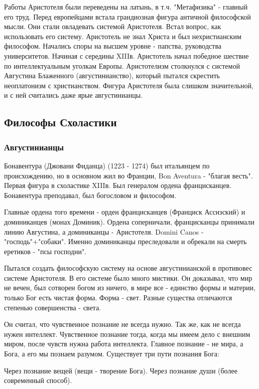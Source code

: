 Работы Аристотеля были переведены на латынь, в т.ч. "Метафизика" - главный его труд. Перед европейцами встала грандиозная фигура античной философской мысли. Они стали овладевать системой Аристотеля. Встал вопрос, как использовать его систему. Аристотель не знал Христа и был нехристианским философом. Начались споры на высшем уровне - папства, руководства университетов. Начиная с середины XIIIв. Аристотель начал победное шествие по интеллектуальным уголкам Европы. Аристотелизм столкнулся с системой Августина Блаженного (августинианство), который пытался скрестить неоплатонизм с христианством. Фигура Аристотеля была слишком значительной, и с ней считались даже ярые августинианцы.
\subsection{Философы Схоластики}
\subsubsection{Августинианцы}

Бонавентура (Джовани Фиданца) (1223 - 1274) был итальянцем по происхождению, но в основном жил во Франции, Bon Aventura - "благая весть". Первая фигура в схоластике XIIIв. Был генералом ордена францисканцев. Бонавентура преподавал, был богословом и философом.

Главные ордена того времени - орден францисканцев (Франциск Ассизский) и доминиканцев (монах Доминик). Ордена соперничали, францисканцы принимали линию Августина, а доминиканцы - Аристотеля. Domini Canos - "господь"+"собаки". Именно доминиканцы преследовали и обрекали на смерть еретиков - "псы господни".

Пытался создать философскую систему на основе августинианской в противовес системе Аристотеля. В его системе было много мистики. Он доказывал, что мир не вечен, был сотворен богом из ничего, в мире все - единство формы и материи, только Бог есть чистая форма. Форма - свет. Разные существа отличаются степенью совершенства - света.

Он считал, что чувственное познание не всегда нужно. Так же, как не всегда нужен интеллект. Чувственное познание тогда, когда мы имеем дело с внешним миром, после чувств нужна работа интеллекта. Главное познание - не мира, а Бога, а его мы познаем разумом. Существует три пути познания Бога:

    Через познание вещей (вещи - творение Бога).
    Через познание души (более современный способ).

